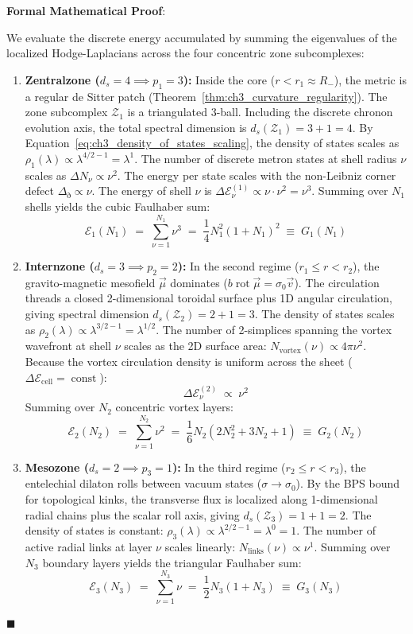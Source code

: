 \documentclass[
    12pt,
    a4paper,
    headings=normal,
    twoside=false,
    open=any,
    parskip=half
]{scrbook}
\newcommand{\ethop}{\eth}
\newenvironment{myproof}[1][]{%
  \par\vspace{6pt}\noindent\textbf{\sffamily\color{maincolor}Formal Mathematical Proof\ifstrempty{#1}{}{ (#1)}}:\par\nopagebreak
}{%
  \penalty50\hfill\ensuremath{\blacksquare}\par\vspace{6pt}
}
\begin{document}
\begin{myproof}
We evaluate the discrete energy accumulated by summing the eigenvalues of the localized Hodge-Laplacians across the four concentric zone subcomplexes:
\begin{enumerate}[label=\textbf{Zone \arabic*:}, leftmargin=2em]
    \item \textbf{Zentralzone ($d_s = 4 \implies p_1 = 3$):}  
    Inside the core ($r < r_1 \approx R_-$), the metric is a regular de Sitter patch (Theorem~\ref{thm:ch3_curvature_regularity}). The zone subcomplex $\mathcal{Z}_1$ is a triangulated 3-ball. Including the discrete chronon evolution axis, the total spectral dimension is $d_s(\mathcal{Z}_1) = 3 + 1 = 4$. 
    By Equation~\eqref{eq:ch3_density_of_states_scaling}, the density of states scales as $\rho_1(\lambda) \propto \lambda^{4/2 - 1} = \lambda^1$.
    The number of discrete metron states at shell radius $\nu$ scales as $\Delta N_\nu \propto \nu^2$. The energy per state scales with the non-Leibniz corner defect $\Delta_\ethop \propto \nu$. 
    The energy of shell $\nu$ is $\Delta \mathcal{E}_\nu^{(1)} \propto \nu \cdot \nu^2 = \nu^3$.
    Summing over $N_1$ shells yields the cubic Faulhaber sum:
    $$\mathcal{E}_1(N_1) \;=\; \sum_{\nu=1}^{N_1} \nu^3 \;=\; \frac{1}{4} N_1^2 (1 + N_1)^2 \;\equiv\; G_1(N_1)$$

    \item \textbf{Internzone ($d_s = 3 \implies p_2 = 2$):}  
    In the second regime ($r_1 \le r < r_2$), the gravito-magnetic mesofield $\vec{\mu}$ dominates ($b \operatorname{rot}\vec{\mu} = \sigma_0 \vec{v}$). The circulation threads a closed 2-dimensional toroidal surface plus 1D angular circulation, giving spectral dimension $d_s(\mathcal{Z}_2) = 2 + 1 = 3$. 
    The density of states scales as $\rho_2(\lambda) \propto \lambda^{3/2 - 1} = \lambda^{1/2}$. 
    The number of 2-simplices spanning the vortex wavefront at shell $\nu$ scales as the 2D surface area: $N_{\text{vortex}}(\nu) \propto 4\pi \nu^2$.
    Because the vortex circulation density is uniform across the sheet ($\Delta\mathcal{E}_{\text{cell}} = \operatorname{const}$):
    $$\Delta \mathcal{E}_\nu^{(2)} \;\propto\; \nu^2$$
    Summing over $N_2$ concentric vortex layers:
    $$\mathcal{E}_2(N_2) \;=\; \sum_{\nu=1}^{N_2} \nu^2 \;=\; \frac{1}{6} N_2 (2N_2^2 + 3N_2 + 1) \;\equiv\; G_2(N_2)$$

    \item \textbf{Mesozone ($d_s = 2 \implies p_3 = 1$):}  
    In the third regime ($r_2 \le r < r_3$), the entelechial dilaton rolls between vacuum states ($\sigma \to \sigma_0$). By the BPS bound for topological kinks, the transverse flux is localized along 1-dimensional radial chains plus the scalar roll axis, giving $d_s(\mathcal{Z}_3) = 1 + 1 = 2$. 
    The density of states is constant: $\rho_3(\lambda) \propto \lambda^{2/2 - 1} = \lambda^0 = 1$. 
    The number of active radial links at layer $\nu$ scales linearly: $N_{\text{links}}(\nu) \propto \nu^1$.
    Summing over $N_3$ boundary layers yields the triangular Faulhaber sum:
    $$\mathcal{E}_3(N_3) \;=\; \sum_{\nu=1}^{N_3} \nu \;=\; \frac{1}{2} N_3 (1 + N_3) \;\equiv\; G_3(N_3)$$


\end{enumerate}
\end{myproof}
\end{document}
